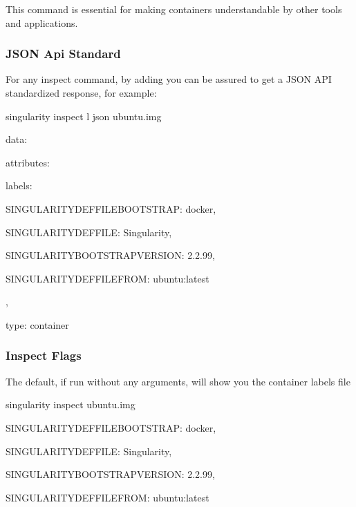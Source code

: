 \documentclass[letterpaper,10pt,english]{sphinxmanual}
\begin{document}
This command is essential for making containers understandable by
other tools and applications.


\subsubsection{JSON Api Standard}
\label{\detokenize{appendix:json-api-standard}}
For any inspect command, by adding  you can be assured to get a
JSON API standardized response, for example:

%
\begin{sphinxVerbatim}[commandchars=\\\{\}]
singularity inspect \PYGZhy{}l \PYGZhy{}\PYGZhy{}json ubuntu.img

\PYGZob{}

    \PYGZdq{}data\PYGZdq{}: \PYGZob{}

        \PYGZdq{}attributes\PYGZdq{}: \PYGZob{}

            \PYGZdq{}labels\PYGZdq{}: \PYGZob{}

                \PYGZdq{}SINGULARITY\PYGZus{}DEFFILE\PYGZus{}BOOTSTRAP\PYGZdq{}: \PYGZdq{}docker\PYGZdq{},

                \PYGZdq{}SINGULARITY\PYGZus{}DEFFILE\PYGZdq{}: \PYGZdq{}Singularity\PYGZdq{},

                \PYGZdq{}SINGULARITY\PYGZus{}BOOTSTRAP\PYGZus{}VERSION\PYGZdq{}: \PYGZdq{}2.2.99\PYGZdq{},

                \PYGZdq{}SINGULARITY\PYGZus{}DEFFILE\PYGZus{}FROM\PYGZdq{}: \PYGZdq{}ubuntu:latest\PYGZdq{}

            \PYGZcb{}

        \PYGZcb{},

        \PYGZdq{}type\PYGZdq{}: \PYGZdq{}container\PYGZdq{}

    \PYGZcb{}

\PYGZcb{}
\end{sphinxVerbatim}


\subsubsection{Inspect Flags}
\label{\detokenize{appendix:inspect-flags}}
The default, if run without any arguments, will show you the container
labels file

%
\begin{sphinxVerbatim}[commandchars=\\\{\}]
\PYGZdl{} singularity inspect ubuntu.img

\PYGZob{}

    \PYGZdq{}SINGULARITY\PYGZus{}DEFFILE\PYGZus{}BOOTSTRAP\PYGZdq{}: \PYGZdq{}docker\PYGZdq{},

    \PYGZdq{}SINGULARITY\PYGZus{}DEFFILE\PYGZdq{}: \PYGZdq{}Singularity\PYGZdq{},

    \PYGZdq{}SINGULARITY\PYGZus{}BOOTSTRAP\PYGZus{}VERSION\PYGZdq{}: \PYGZdq{}2.2.99\PYGZdq{},

    \PYGZdq{}SINGULARITY\PYGZus{}DEFFILE\PYGZus{}FROM\PYGZdq{}: \PYGZdq{}ubuntu:latest\PYGZdq{}

\PYGZcb{}
\end{sphinxVerbatim}
\end{document}
